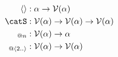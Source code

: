 \documentclass[preview]{standalone}
\begin{document}
\begin{align}%
  \vect{} &: \alpha \rightarrow \mathcal{V}(\alpha) \\
  \catS   &: \mathcal{V}(\alpha) \rightarrow \mathcal{V}(\alpha) \rightarrow \mathcal{V}(\alpha)\\
  _{@n}    &: \mathcal{V}(\alpha) \rightarrow \alpha \\
  _{@\vect{2..}}  &: \mathcal{V}(\alpha) \rightarrow \mathcal{V}(\alpha)%
\end{align}
\end{document}
